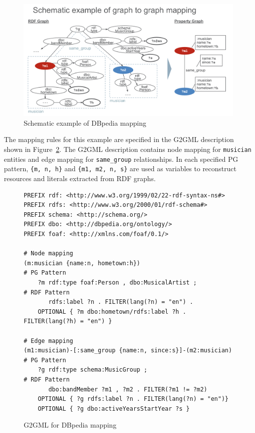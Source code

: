 \documentclass[runningheads]{llncs}
\begin{document}
\begin{figure}
\center
\includegraphics[width=1.0\textwidth]{example.jpg}
\caption{Schematic example of DBpedia mapping}
\label{fig:conversion}
\end{figure}
 
The mapping rules for this example are specified in the G2GML description shown in Figure~\ref{fig:g2gml}. The G2GML description contains node mapping for \texttt{musician} entities and edge mapping for \texttt{same\_group} relationships.
In each specified PG pattern, \texttt{\{m, n, h\}} and \texttt{\{m1, m2, n, s\}} are used as variables to reconstruct resources and literals extracted from RDF graphs. 
 

\begin{figure}[!t]
\vspace{2mm}
\begin{scriptsize}
\begin{verbatim}
PREFIX rdf: <http://www.w3.org/1999/02/22-rdf-syntax-ns#>
PREFIX rdfs: <http://www.w3.org/2000/01/rdf-schema#>
PREFIX schema: <http://schema.org/>
PREFIX dbo: <http://dbpedia.org/ontology/>
PREFIX foaf: <http://xmlns.com/foaf/0.1/>
 
# Node mapping
(m:musician {name:n, hometown:h})                            # PG Pattern
    ?m rdf:type foaf:Person , dbo:MusicalArtist ;            # RDF Pattern
       rdfs:label ?n . FILTER(lang(?n) = "en") .
    OPTIONAL { ?m dbo:hometown/rdfs:label ?h . FILTER(lang(?h) = "en") }
 
# Edge mapping
(m1:musician)-[:same_group {name:n, since:s}]-(m2:musician)   # PG Pattern
    ?g rdf:type schema:MusicGroup ;                          # RDF Pattern
       dbo:bandMember ?m1 , ?m2 . FILTER(?m1 != ?m2)
    OPTIONAL { ?g rdfs:label ?n . FILTER(lang(?n) = "en")}
    OPTIONAL { ?g dbo:activeYearsStartYear ?s }
\end{verbatim}
\end{scriptsize}
\caption{G2GML for DBpedia mapping}
\label{fig:g2gml}
\end{figure}
 
\end{document}
